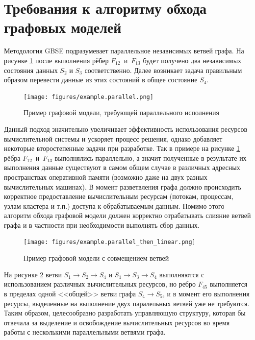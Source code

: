 \section{Требования к алгоритму обхода графовых моделей}\label{sec:algorithm_task}

Методология GBSE подразумевает параллельное независимых ветвей графа. На рисунке \ref{fig:parallelExample} после выполнения рёбер $F_{12}$~и~$F_{13}$ будет получено два независимых состояния данных $S_2$ и $S_3$ соответственно. Далее возникает задача правильным образом перевести данные из этих состояний в общее состояние $S_4$.
\begin{figure}[!ht]
    \centering
    \texttt{[image: figures/example.parallel.png]}
    \caption{Пример графовой модели, требующей параллельного исполнения}
    \label{fig:parallelExample}
\end{figure}

Данный подход значительно увеличивает эффективность использования ресурсов вычислительной системы и ускоряет процесс решения, однако добавляет некоторые второстепенные задачи при разработке. Так в примере на рисунке \ref{fig:parallelExample} рёбра $F_{12}$~и~$F_{13}$ выполнялись параллельно, а значит полученные в результате их выполнения данные существуют в самом общем случае в различных адресных пространствах оперативной памяти (возможно даже на двух разных вычислительных машинах). В момент разветвления графа должно происходить корректное предоставление вычислительным ресурсам (потокам, процессам, узлам кластера и т.п.) доступа к обрабатываемым данным. Помимо этого алгоритм обхода графовой модели должен корректно отрабатывать слияние ветвей графа и в частности при необходимости выполнять сбор данных.

\begin{figure}[!ht]
    \centering
    \texttt{[image: figures/example.parallel\_then\_linear.png]}
    \caption{Пример графовой модели с совмещением ветвей}
    \label{fig:parallelThenLinearExample}
\end{figure}

На рисунке \ref{fig:parallelThenLinearExample} ветви $S_1 \rightarrow S_2 \rightarrow S_4$ и $S_1 \rightarrow S_3 \rightarrow S_4$ выполняются с использованием различных вычислительных ресурсов, но ребро $F_{45}$ выполняется в пределах одной <<общей>> ветви графа $S_4 \rightarrow S_5$, и в момент его выполнения ресурсы, выделенные на выполнение двух паралельных ветвей уже не требуются. Таким образом, целесообразно разработать управляющую структуру, которая бы отвечала за выделение и освобождение вычислительных ресурсов во время работы с несколькими параллельными ветвями графа.

